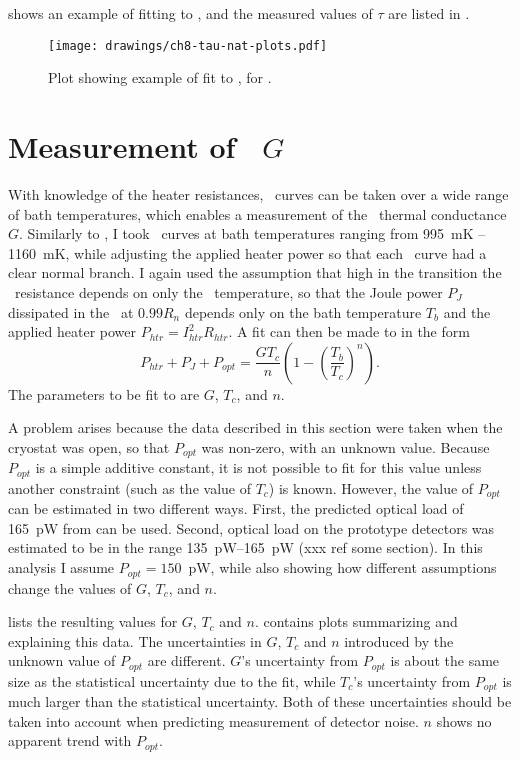  shows an example of fitting to , and the measured values of $\tau$ are listed in .

\begin{figure*}
  \centering
\texttt{[image: drawings/ch8-tau-nat-plots.pdf]}
\caption{
  Plot showing example of fit to , for .
} 
\label{fig:tau-nat-plots}
\end{figure*}

\section{Measurement of \TES\ $G$} \label{sec:g-psat}

With knowledge of the heater resistances, \IV\ curves can be taken over a wide range of bath temperatures, which enables a measurement of the \TES\ thermal conductance $G$.
Similarly to , I took \IV\ curves at bath temperatures ranging from 995~mK -- 1160~mK, while adjusting the applied heater power so that each \IV\ curve had a clear normal branch.
I again used the assumption that high in the transition the \TES\ resistance depends on only the \TES\ temperature, so that the Joule power $P_J$ dissipated in the \TES\ at $0.99R_n$ depends only on the bath temperature $T_b$ and the applied heater power $P_{htr} = I_{htr}^2 R_{htr}$. A fit can then be made to  in the form
\begin{equation}\label{eqn:g-fit}
P_{htr} + P_J + P_{opt}= \frac{G T_c}{n}\left(1 - \left(\frac{T_b}{T_c}\right)^n\right).
\end{equation}
The parameters to be fit to are $G$, $T_c$, and $n$.

A problem arises because the data described in this section were taken when the cryostat was open, so that $P_{opt}$ was non-zero, with an unknown value.
Because $P_{opt}$ is a simple additive constant, it is not possible to fit for this value unless another constraint (such as the value of $T_c$) is known.
However, the value of $P_{opt}$ can be estimated in two different ways. 
First, the predicted optical load of 165~pW from  can be used.
Second, optical load on the prototype detectors was estimated to be in the range 135~pW--165~pW (xxx ref some section).
In this analysis I assume $P_{opt} = 150$~pW, while also showing how different assumptions change the values of  $G$, $T_c$, and $n$.

 lists the resulting values for $G$, $T_c$ and $n$.
 contains plots summarizing and explaining this data.
The uncertainties in $G$, $T_c$ and $n$ introduced by the unknown value of $P_{opt}$ are different.
$G$'s uncertainty from $P_{opt}$ is about the same size as the statistical uncertainty due to the fit, while $T_c$'s uncertainty from $P_{opt}$ is much larger than the statistical uncertainty.
Both of these uncertainties should be taken into account when predicting measurement of detector noise.
$n$ shows no apparent trend with $P_{opt}$.

